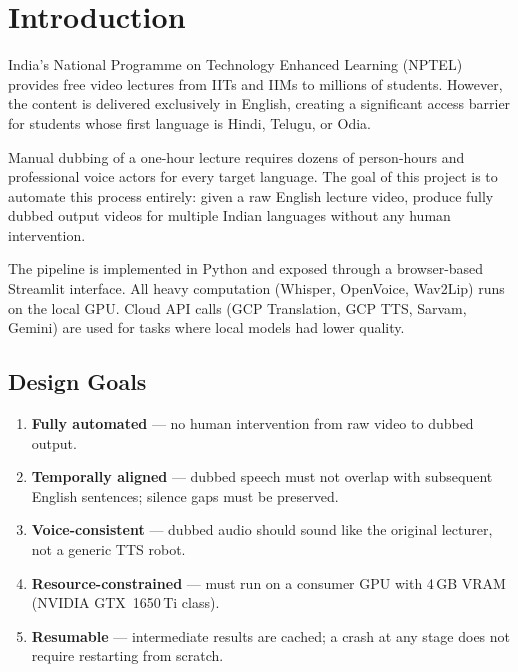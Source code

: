 \documentclass[12pt,a4paper]{article}
\begin{document}
\section{Introduction}

India's National Programme on Technology Enhanced Learning (NPTEL) provides
free video lectures from IITs and IIMs to millions of students.  However,
the content is delivered exclusively in English, creating a significant
access barrier for students whose first language is Hindi, Telugu, or Odia.

Manual dubbing of a one-hour lecture requires dozens of person-hours and
professional voice actors for every target language.  The goal of this
project is to automate this process entirely: given a raw English lecture
video, produce fully dubbed output videos for multiple Indian languages
without any human intervention.

The pipeline is implemented in Python and exposed through a browser-based
Streamlit interface.  All heavy computation (Whisper, OpenVoice, Wav2Lip) runs
on the local GPU.  Cloud API calls (GCP Translation, GCP TTS, Sarvam,
Gemini) are used for tasks where local models had lower quality.

\subsection{Design Goals}

\begin{enumerate}[leftmargin=*, label=\textbf{G\arabic*.}]
  \item \textbf{Fully automated} — no human intervention from raw video to
        dubbed output.
  \item \textbf{Temporally aligned} — dubbed speech must not overlap with
        subsequent English sentences; silence gaps must be preserved.
  \item \textbf{Voice-consistent} — dubbed audio should sound like the
        original lecturer, not a generic TTS robot.
  \item \textbf{Resource-constrained} — must run on a consumer GPU with
        4\,GB VRAM (NVIDIA GTX~1650\,Ti class).
  \item \textbf{Resumable} — intermediate results are cached; a crash at
        any stage does not require restarting from scratch.
\end{enumerate}
\end{document}

